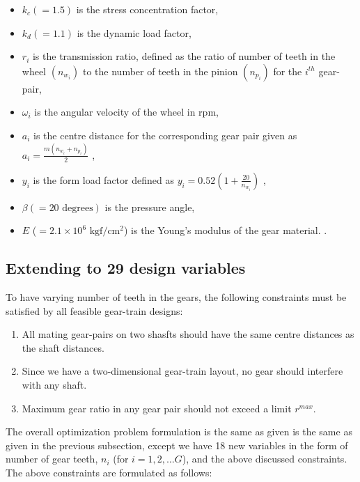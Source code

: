 \begin{singlespacing}
\begin{itemize}
\item $k_c(=1.5)$ is the stress concentration factor,
\item $k_d(=1.1)$ is the dynamic load factor,
\item $r_i$ is the transmission ratio, defined as the ratio of number 
of teeth in the wheel $(n_{w_i})$ to the number of teeth in the 
pinion $(n_{p_i})$ for the $i^{th}$ gear-pair,
\item ${\omega}_i$ is the angular velocity of the wheel in rpm,
\item $a_i$ is the centre distance for the corresponding gear pair
given as 
\\
$a_i = \frac {m ( n_{w_i} + n_{p_i})} {2}$ , 
\item $y_i$ is the form load factor defined as 
$y_i = 0.52(1+ \frac{20}{n_{w_i}} )$ , 
\item ${\beta}(= 20 \text{ degrees})$ is the pressure angle,
\item $E $ ($= 2.1 \times 10^6\text{ kgf}/\text{cm}^2$) is the Young's modulus of the gear material. .
\end{itemize}

\end{singlespacing}


\subsection{Extending to 29 design variables}
To have varying number of teeth in the gears, the following 
constraints must be satisfied by all feasible gear-train designs:

\begin{enumerate}
\item All mating gear-pairs on  two shasfts should have the same 
centre distances as the shaft distances.
\item Since we have a two-dimensional gear-train layout, no gear 
should interfere with any shaft.
\item Maximum gear ratio in any gear pair should not exceed a limit 
$r^{max}$.
\end{enumerate}

The overall optimization problem formulation is the same as given is the 
same as given in the previous subsection, except we have 18 new 
variables in the form of number of gear teeth, $n_i$ (for $i = 1, 2,
\dots G$), and the above discussed constraints. The above constraints
are formulated as follows:


